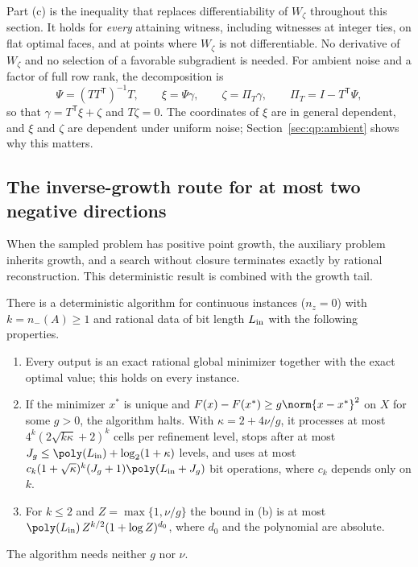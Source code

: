 Part (c) is the inequality that replaces differentiability of $W_\zeta$
throughout this section. It holds for \emph{every} attaining witness,
including witnesses at integer ties, on flat optimal faces, and at points
where $W_\zeta$ is not differentiable. No derivative of $W_\zeta$ and no
selection of a favorable subgradient is needed. For ambient noise and a
factor of full row rank, the decomposition is
\[
 \Psi=(TT^{\mathsf T})^{-1}T,\qquad \xi=\Psi\gamma,\qquad
 \zeta=\Pi_T\gamma,\qquad \Pi_T=I-T^{\mathsf T}\Psi,
\]
so that $\gamma=T^{\mathsf T}\xi+\zeta$ and $T\zeta=0$. The coordinates of $\xi$ are
in general dependent, and $\xi$ and $\zeta$ are dependent under uniform
noise; Section~\ref{sec:qp:ambient} shows why this matters.

\subsection{The inverse-growth route for at most two negative directions}\label{sec:qp:growth}

When the sampled problem has positive point growth, the auxiliary problem
inherits growth, and a search without closure terminates exactly by rational
reconstruction. This deterministic result is combined with the growth tail.

\begin{theorem}\label{thm:qp:conditioned}
There is a deterministic algorithm for continuous instances ($n_z=0$) with
$k=n_-(A)\ge1$ and rational data of bit length $L_{\rm in}$ with the
following properties.
\begin{enumerate}[label=(\alph*)]
\item Every output is an exact rational global minimizer together with the
 exact optimal value; this holds on every instance.
\item If the minimizer $x^*$ is unique and $F(x)-F(x^*)\ge g\norm{x-x^*}^2$ on
 $X$ for some $g>0$, the algorithm halts. With $\kappa=2+4\nu/g$, it
 processes at most $4^k(2\sqrt{k\kappa}+2)^k$ cells per refinement level,
 stops after at most $J_g\le\poly(L_{\rm in})+\log_2(1+\kappa)$ levels, and
 uses at most $c_k(1+\sqrt\kappa)^k(J_g+1)\poly(L_{\rm in}+J_g)$ bit
 operations, where $c_k$ depends only on $k$.
\item For $k\le2$ and $Z=\max\{1,\nu/g\}$ the bound in (b) is at most
 $\poly(L_{\rm in})\,Z^{k/2}(1+\log Z)^{d_0}$, where $d_0$ and the polynomial
 are absolute.
\end{enumerate}
The algorithm needs neither $g$ nor $\nu$.
\end{theorem}

